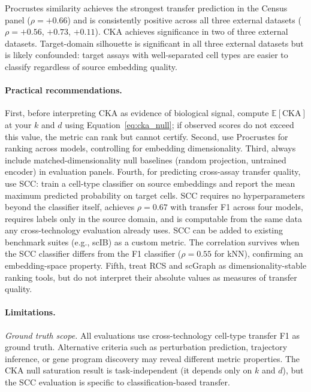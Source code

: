 \documentclass[11pt]{article}
\begin{document}
Procrustes similarity achieves the strongest transfer prediction in the
Census panel ($\rho = +0.66$) and is consistently positive across all
three external datasets ($\rho = +0.56$, $+0.73$, $+0.11$). CKA
achieves significance in two of three external datasets. Target-domain
silhouette is significant in all three external datasets but is likely
confounded: target assays with well-separated cell types are easier to
classify regardless of source embedding quality.

\paragraph{Practical recommendations.} First, before interpreting CKA as
evidence of biological signal, compute $\mathbb{E}[\mathrm{CKA}]$ at
your $k$ and $d$ using Equation~\ref{eq:cka_null}; if observed scores do
not exceed this value, the metric can rank but cannot certify. Second,
use Procrustes for ranking across models, controlling for
embedding dimensionality. Third, always include matched-dimensionality
null baselines (random projection, untrained encoder) in evaluation
panels. Fourth, for predicting cross-assay transfer quality, use SCC:
train a cell-type classifier on source embeddings and report the mean
maximum predicted probability on target cells. SCC requires no
hyperparameters beyond the classifier itself, achieves $\rho = 0.67$
with transfer F1 across four models, requires labels only in the
source domain, and is computable from the same data any
cross-technology evaluation already uses. SCC can be added to existing benchmark suites (e.g., scIB) as a
custom metric. The correlation survives
when the SCC classifier differs from the F1 classifier ($\rho = 0.55$
for kNN), confirming an embedding-space property. Fifth, treat RCS and scGraph
as dimensionality-stable ranking tools, but do not interpret their
absolute values as measures of transfer quality.

\paragraph{Limitations.}

\emph{Ground truth scope.} All evaluations use cross-technology
cell-type transfer F1 as ground truth. Alternative criteria such as
perturbation prediction, trajectory inference, or gene program
discovery may reveal different metric properties. The CKA null
saturation result is task-independent (it depends only on $k$ and $d$),
but the SCC evaluation is specific to classification-based transfer.
\end{document}
